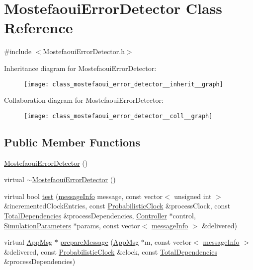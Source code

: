 \hypertarget{class_mostefaoui_error_detector}{}\section{Mostefaoui\+Error\+Detector Class Reference}
\label{class_mostefaoui_error_detector}


{\ttfamily \#include $<$Mostefaoui\+Error\+Detector.\+h$>$}



Inheritance diagram for Mostefaoui\+Error\+Detector\+:\nopagebreak
\begin{figure}[H]
\begin{center}
\leavevmode
\texttt{[image: class\_mostefaoui\_error\_detector\_\_inherit\_\_graph]}
\end{center}
\end{figure}


Collaboration diagram for Mostefaoui\+Error\+Detector\+:\nopagebreak
\begin{figure}[H]
\begin{center}
\leavevmode
\texttt{[image: class\_mostefaoui\_error\_detector\_\_coll\_\_graph]}
\end{center}
\end{figure}
\subsection*{Public Member Functions}
\begin{DoxyCompactItemize}
\item 
\hyperlink{class_mostefaoui_error_detector_a2a76ea0d2e986ce379c5686f48f887dc}{Mostefaoui\+Error\+Detector} ()
\item 
virtual \hyperlink{class_mostefaoui_error_detector_a8658848d90c291c1364962c0759ca806}{$\sim$\+Mostefaoui\+Error\+Detector} ()
\item 
virtual bool \hyperlink{class_mostefaoui_error_detector_a293f6cf144526bc8694fc4f1fc0daeb5}{test} (\hyperlink{structures_8h_a7e7bdc1d2fff8a9436f2f352b2711ed6}{message\+Info} message, const vector$<$ unsigned int $>$ \&incremented\+Clock\+Entries, const \hyperlink{class_probabilistic_clock}{Probabilistic\+Clock} \&process\+Clock, const \hyperlink{class_total_dependencies}{Total\+Dependencies} \&process\+Dependencies, \hyperlink{class_controller}{Controller} $\ast$control, \hyperlink{class_simulation_parameters}{Simulation\+Parameters} $\ast$params, const vector$<$ \hyperlink{structures_8h_a7e7bdc1d2fff8a9436f2f352b2711ed6}{message\+Info} $>$ \&delivered)
\item 
virtual \hyperlink{class_app_msg}{App\+Msg} $\ast$ \hyperlink{class_mostefaoui_error_detector_adcd530d7349df19adb614ca414225214}{prepare\+Message} (\hyperlink{class_app_msg}{App\+Msg} $\ast$m, const vector$<$ \hyperlink{structures_8h_a7e7bdc1d2fff8a9436f2f352b2711ed6}{message\+Info} $>$ \&delivered, const \hyperlink{class_probabilistic_clock}{Probabilistic\+Clock} \&clock, const \hyperlink{class_total_dependencies}{Total\+Dependencies} \&process\+Dependencies)
\end{DoxyCompactItemize}


